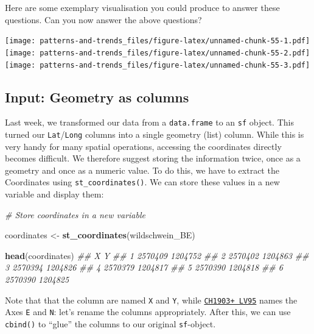 \documentclass[]{book}
\newenvironment{Shaded}{\begin{snugshade}}{\end{snugshade}}
\newcommand{\CommentTok}[1]{\textcolor[rgb]{0.56,0.35,0.01}{\textit{#1}}}
\newcommand{\KeywordTok}[1]{\textcolor[rgb]{0.13,0.29,0.53}{\textbf{#1}}}
\newcommand{\NormalTok}[1]{#1}
\newcommand{\StringTok}[1]{\textcolor[rgb]{0.31,0.60,0.02}{#1}}
\begin{document}
Here are some exemplary visualisation you could produce to answer these questions. Can you now answer the above questions?

\texttt{[image: patterns-and-trends\_files/figure-latex/unnamed-chunk-55-1.pdf]} \texttt{[image: patterns-and-trends\_files/figure-latex/unnamed-chunk-55-2.pdf]} \texttt{[image: patterns-and-trends\_files/figure-latex/unnamed-chunk-55-3.pdf]}

\hypertarget{input-geometry-as-columns}{%
\subsection{Input: Geometry as columns}\label{input-geometry-as-columns}}

Last week, we transformed our data from a \texttt{data.frame} to an \texttt{sf} object. This turned our \texttt{Lat}/\texttt{Long} columns into a single geometry (list) column. While this is very handy for many spatial operations, accessing the coordinates directly becomes difficult. We therefore suggest storing the information twice, once as a geometry and once as a numeric value. To do this, we have to extract the Coordinates using \texttt{st\_coordinates()}. We can store these values in a new variable and display them:

\begin{Shaded}
\begin{Highlighting}[]
\CommentTok{# Store coordinates in a new variable}

\NormalTok{coordinates <-}\StringTok{ }\KeywordTok{st_coordinates}\NormalTok{(wildschwein_BE)}

\KeywordTok{head}\NormalTok{(coordinates)}
\CommentTok{##         X       Y}
\CommentTok{## 1 2570409 1204752}
\CommentTok{## 2 2570402 1204863}
\CommentTok{## 3 2570394 1204826}
\CommentTok{## 4 2570379 1204817}
\CommentTok{## 5 2570390 1204818}
\CommentTok{## 6 2570390 1204825}
\end{Highlighting}
\end{Shaded}

Note that that the column are named \texttt{X} and \texttt{Y}, while \href{https://www.swisstopo.admin.ch/de/wissen-fakten/geodaesie-vermessung/neue-koordinaten.html}{\texttt{CH1903+\ LV95}} names the Axes \texttt{E} and \texttt{N}: let's rename the columns appropriately. After this, we can use \texttt{cbind()} to ``glue'' the columns to our original \texttt{sf}-object.
\end{document}
